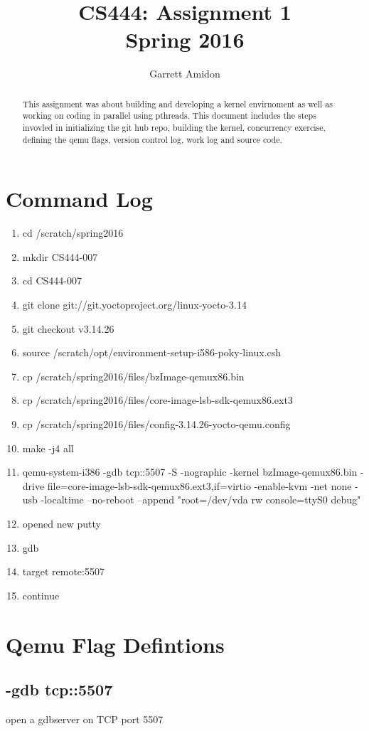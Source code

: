 \documentclass[letterpaper,10pt,titlepage,draftclsnofoot,onecolumn]{IEEEtran}
\title{CS444: Assignment 1 \\
	\large Spring 2016}
\author{Garrett Amidon}
\begin{document}
\begin{titlingpage}
    \maketitle
	\centering{}
    \begin{abstract}
        This assignment was about building and developing a kernel envirnoment as well as working on coding in parallel using pthreads. This document includes the steps invovled in initializing the git hub repo, building the kernel, concurrency exercise, defining the qemu flags, version control log, work log and source code.  
    \end{abstract}
\end{titlingpage}
\section{Command Log}
\begin{enumerate}
\item cd /scratch/spring2016
\item mkdir CS444-007
\item cd CS444-007
\item git clone git://git.yoctoproject.org/linux-yocto-3.14
\item git checkout v3.14.26
\item source /scratch/opt/environment-setup-i586-poky-linux.csh
\item cp /scratch/spring2016/files/bzImage-qemux86.bin
\item cp /scratch/spring2016/files/core-image-lsb-sdk-qemux86.ext3 
\item cp /scratch/spring2016/files/config-3.14.26-yocto-qemu.config
\item make -j4 all
\item qemu-system-i386 -gdb tcp::5507 -S -nographic -kernel bzImage-qemux86.bin -drive file=core-image-lsb-sdk-qemux86.ext3,if=virtio -enable-kvm -net none -usb -localtime --no-reboot --append "root=/dev/vda rw console=ttyS0 debug"
\item opened new putty
\item gdb
\item target remote:5507
\item continue
\end{enumerate}
\section{Qemu Flag Defintions}
\subsection{-gdb tcp::5507}
open a gdbserver on TCP port 5507
\end{document}
